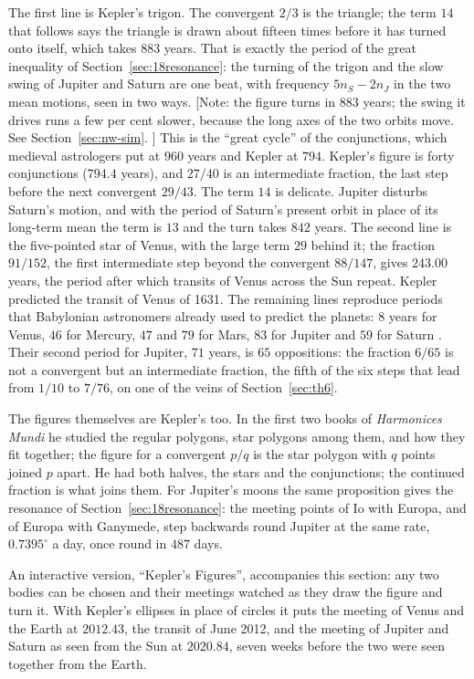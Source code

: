 The first line is Kepler's trigon. The convergent $2/3$ is the triangle; the term $14$ that follows says
the triangle is drawn about fifteen times before it has turned onto itself, which takes $883$ years. That
is exactly the period of the great inequality of Section~\ref{sec:18resonance}: the turning of the trigon
and the slow swing of Jupiter and Saturn are one beat, with frequency $5n_S-2n_J$ in the two mean
motions, seen in two ways. [Note: the figure turns in $883$ years; the swing it drives runs a few per cent slower, because the long axes of the two orbits move. See Section~\ref{sec:nw-sim}. \addedon{\revF}] This is the ``great cycle'' of the conjunctions, which medieval astrologers
put at $960$ years and Kepler at $794$. Kepler's figure is forty conjunctions ($794.4$ years), and $27/40$
is an intermediate fraction, the last step before the next convergent $29/43$. The term $14$ is delicate.
Jupiter disturbs Saturn's motion, and with the period of Saturn's present orbit in place of its long-term
mean the term is $13$ and the turn takes $842$ years. The second line is the five-pointed star of Venus,
with the large term $29$ behind it; the fraction $91/152$, the first intermediate step beyond the
convergent $88/147$, gives $243.00$ years, the period after which transits of Venus across
the Sun repeat. Kepler predicted the transit of Venus of 1631. The remaining lines
reproduce periods that Babylonian astronomers already used to predict the planets: $8$ years for Venus,
$46$ for Mercury, $47$ and $79$ for Mars, $83$ for Jupiter and $59$ for Saturn \cite{gray2009}.
Their second period for Jupiter, $71$ years, is $65$ oppositions: the fraction $6/65$ is not a convergent
but an intermediate fraction, the fifth of the six steps that lead from $1/10$ to $7/76$, on one of the
veins of Section~\ref{sec:th6}.

The figures themselves are Kepler's too. In the first two books of \emph{Harmonices Mundi} he studied the
regular polygons, star polygons among them, and how they fit together; the figure for a convergent $p/q$
is the star polygon with $q$ points joined $p$ apart.
He had both halves, the stars and the conjunctions; the continued fraction is what joins them. For
Jupiter's moons the same proposition gives the resonance of Section~\ref{sec:18resonance}: the meeting
points of Io with Europa, and of Europa with Ganymede, step backwards round Jupiter at the same rate,
$0.7395^{\circ}$ a day, once round in $487$ days.

An interactive version, ``Kepler's Figures'', accompanies this section: any two bodies can be chosen and
their meetings watched as they draw the figure and turn it. With Kepler's ellipses in place of circles it
puts the meeting of Venus and the Earth at $2012.43$, the transit of June 2012, and the meeting of Jupiter
and Saturn as seen from the Sun at $2020.84$, seven weeks before the two were seen together from the
Earth.

